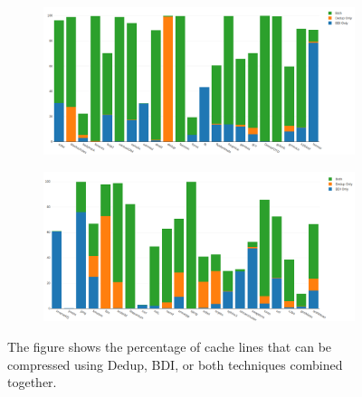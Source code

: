 \begin{figure}
    \begin{subfigure}[t]{\textwidth}
        \includegraphics[width=\textwidth]{CompPotential1.png}
    \end{subfigure}
    \begin{subfigure}[b]{\textwidth}
        \includegraphics[width=\textwidth]{CompPotential2.png}
    \end{subfigure}
    \caption[Compressible lines]{The figure shows the percentage of cache lines that can be compressed using Dedup, BDI, or both techniques combined together.}
    \label{fig:CompPossibility}
\end{figure}

